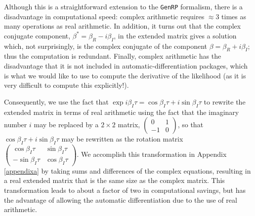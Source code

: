 \documentclass[manuscript, letterpaper]{aastex6}
\makeatletter
\let\origsubsection\subsection
\renewcommand\subsection{\@ifstar{\starsubsection}{\nostarsubsection}}
\newcommand\nostarsubsection[1]{\subsectionprelude\origsubsection{#1}}
\newcommand\starsubsection[1]{\subsectionprelude\origsubsection*{#1}}
\newcommand\subsectionprelude{\vspace{1em}}
\makeatother
\begin{document}
Although this is a straightforward extension to the \texttt{GenRP} formalism, there is a disadvantage
in computational speed:  complex arithmetic requires $\approx 3$ times as many operations as real
arithmetic.  In addition, it turns out that the complex conjugate component, $\beta^* = \beta_R - i\beta_I$, in 
the extended matrix gives a solution which, not surprisingly, is the complex conjugate of the
component $\beta = \beta_R + i \beta_I$;  thus the computation is redundant.  Finally, complex
arithmetic has the disadvantage that it is not included in automatic-differentiation packages,
which is what we would like to use to compute the derivative of the likelihood (as it is very difficult
to compute this explicitly!).

Consequently, we use the fact that $\exp{i\beta_I \tau} =  \cos{\beta_I \tau} + i \sin{\beta_I \tau}$ to
rewrite the extended matrix in terms of real arithmetic using the fact that the imaginary number $i$
may be replaced by a $2\times 2$ matrix, $ \begin{pmatrix} 0 & 1 \\ -1 & 0\end{pmatrix}$, so that
$\cos{\beta_I \tau} + i \sin{\beta_I \tau}$ may be rewritten as the rotation matrix
$\begin{pmatrix} \cos{\beta_I \tau} & \sin{\beta_I \tau} \\ -\sin{\beta_I \tau} & \cos{\beta_I \tau}\end{pmatrix}$.
We accomplish this transformation in Appendix \ref{appendixa} by taking sums and differences of the complex 
equations, resulting in a real extended matrix that is the same size as the complex matrix.
This transformation leads to about a factor of two in computational savings, but has the
advantage of allowing the automatic differentiation due to the use of real arithmetic.

\subsection{Kernel components}
\end{document}
